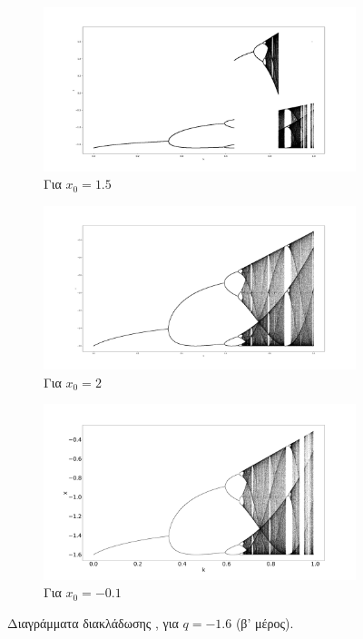 \begin{figure}[ht]
	\centering
	\begin{subfigure}[b]{0.7\textwidth}
		\centering
		\includegraphics[width=\textwidth]{LateX images/graphs q16/g4}
		\caption{Για \(x_0=1.5\)}
		\label{f:g30}
	\end{subfigure}
	\hfill	
	\begin{subfigure}[b]{0.7\textwidth}
		\centering
		\includegraphics[width=\textwidth]{LateX images/graphs q16/g5}
		\caption{Για \(x_0=2\)}
		\label{f:g31}
	\end{subfigure}
	\hfill
	\begin{subfigure}[b]{0.7\textwidth}
		\centering
		\includegraphics[width=\textwidth]{LateX images/graphs q16/g6}
		\caption{Για \(x_0=-0.1\)}
		\label{f:g32}
	\end{subfigure}
	\hfill
	\caption{ Διαγράμματα διακλάδωσης , για  $q=-1.6$ (β' μέρος).}
	\label{f:g235}
\end{figure}

